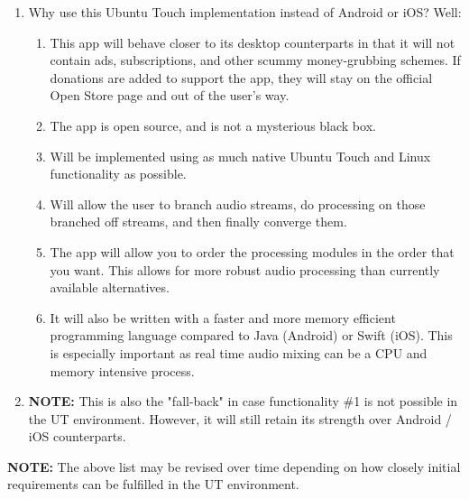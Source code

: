\begin{enumerate}
\begin{enumerate}
		\item Why use this Ubuntu Touch implementation instead of Android or iOS? Well:
		\begin{enumerate}
			\item This app will behave closer to its desktop counterparts in that it will not contain ads, subscriptions, and other scummy money-grubbing schemes. If donations are added to support the app, they will stay on the official Open Store page and out of the user's way.
			\item The app is open source, and is not a mysterious black box.
			\item Will be implemented using as much native Ubuntu Touch and Linux functionality as possible.
			\item Will allow the user to branch audio streams, do processing on those branched off streams, and then finally converge them.
			\item The app will allow you to order the processing modules in the order that you want. This allows for more robust audio processing than currently available alternatives.
			\item It will also be written with a faster and more memory efficient programming language compared to Java (Android) or Swift (iOS). This is especially important as real time audio mixing can be a CPU and memory intensive process.
		\end{enumerate}
		
		\item \textbf{NOTE: } This is also the "fall-back" in case functionality \#1 is not possible in the UT environment. However, it will still retain its strength over Android / iOS counterparts.
	\end{enumerate}
\end{enumerate}


\textbf{NOTE:} The above list may be revised over time depending on how closely initial requirements can be fulfilled in the UT environment.
